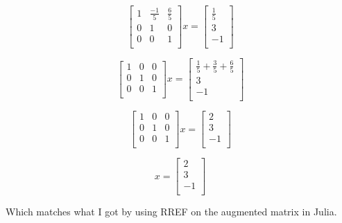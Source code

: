 \documentclass{article}
\begin{document}
$$\begin{bmatrix}
  1  & \frac{-1}{5} & \frac{6}{5} \\
    0 & 1 & 0 \\
    0  & 0 & 1 \\
\end{bmatrix}x = \begin{bmatrix}
  \frac{1}{5}  \\
  3 \\
  -1\\
\end{bmatrix}$$

$$\begin{bmatrix}
  1  & 0 & 0 \\
    0 & 1 & 0 \\
    0  & 0 & 1 \\
\end{bmatrix}x = \begin{bmatrix}
  \frac{1}{5} + \frac{3}{5} + \frac{6}{5}  \\
  3 \\
  -1\\
\end{bmatrix}$$

$$\begin{bmatrix}
  1  & 0 & 0 \\
    0 & 1 & 0 \\
    0  & 0 & 1 \\
\end{bmatrix}x = \begin{bmatrix}
  2  \\
  3 \\
  -1\\
\end{bmatrix}$$

$$x = \begin{bmatrix}
  2  \\
  3 \\
  -1\\
\end{bmatrix}$$

Which matches what I got by using RREF on the augmented matrix in Julia.
\end{document}
